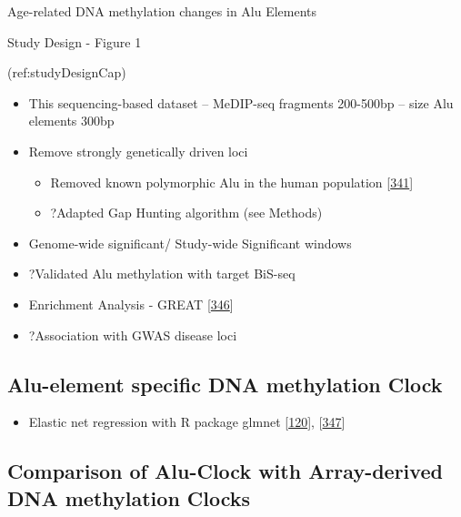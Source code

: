 \documentclass[
]{book}
\providecommand{\tightlist}{%
  \setlength{\itemsep}{0pt}\setlength{\parskip}{0pt}}
\begin{document}
Age-related DNA methylation changes in Alu Elements

Study Design - Figure 1

(ref:studyDesignCap)

\begin{itemize}
\tightlist
\item
  This sequencing-based dataset -- MeDIP-seq fragments 200-500bp -- size Alu elements 300bp
\item
  Remove strongly genetically driven loci

  \begin{itemize}
  \tightlist
  \item
    Removed known polymorphic Alu in the human population {[}\protect\hyperlink{ref-Payer2017}{341}{]}
  \item
    ?Adapted Gap Hunting algorithm (see Methods)
  \end{itemize}
\item
  Genome-wide significant/ Study-wide Significant windows
\item
  ?Validated Alu methylation with target BiS-seq
\item
  Enrichment Analysis - GREAT {[}\protect\hyperlink{ref-McLean2010}{346}{]}
\item
  ?Association with GWAS disease loci
\end{itemize}

\hypertarget{alu-element-specific-dna-methylation-clock}{%
\subsection{Alu-element specific DNA methylation Clock}\label{alu-element-specific-dna-methylation-clock}}

\begin{itemize}
\tightlist
\item
  Elastic net regression with R package glmnet {[}\protect\hyperlink{ref-Friedman2010}{120}{]}, {[}\protect\hyperlink{ref-Engebretsen2019}{347}{]}
\end{itemize}

\hypertarget{comparison-of-alu-clock-with-array-derived-dna-methylation-clocks}{%
\subsection{Comparison of Alu-Clock with Array-derived DNA methylation Clocks}\label{comparison-of-alu-clock-with-array-derived-dna-methylation-clocks}}
\end{document}
